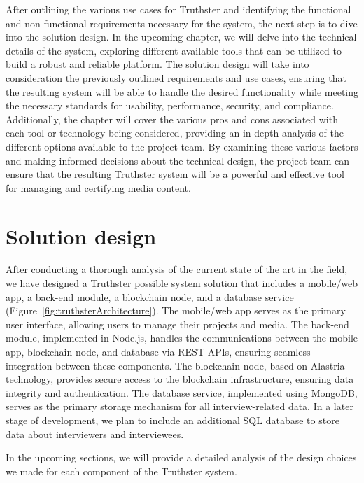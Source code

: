 \documentclass[target=mst,aauheader=]{thud}
\begin{document}
After outlining the various use cases for Truthster and identifying the functional and non-functional requirements necessary for the system, the next step is to dive into the solution design. In the upcoming chapter, we will delve into the technical details of the system, exploring different available tools that can be utilized to build a robust and reliable platform. The solution design will take into consideration the previously outlined requirements and use cases, ensuring that the resulting system will be able to handle the desired functionality while meeting the necessary standards for usability, performance, security, and compliance. Additionally, the chapter will cover the various pros and cons associated with each tool or technology being considered, providing an in-depth analysis of the different options available to the project team. By examining these various factors and making informed decisions about the technical design, the project team can ensure that the resulting Truthster system will be a powerful and effective tool for managing and certifying media content.








\chapter{Solution design}
\label{chapter:solutionDesign}

After conducting a thorough analysis of the current state of the art in the field, we have designed a Truthster possible system solution that includes a mobile/web app, a back-end module, a blockchain node, and a database service (Figure~\ref{fig:truthsterArchitecture}). The mobile/web app serves as the primary user interface, allowing users to manage their projects and media. The back-end module, implemented in Node.js, handles the communications between the mobile app, blockchain node, and database via REST APIs, ensuring seamless integration between these components. The blockchain node, based on Alastria technology, provides secure access to the blockchain infrastructure, ensuring data integrity and authentication. The database service, implemented using MongoDB, serves as the primary storage mechanism for all interview-related data. In a later stage of development, we plan to include an additional SQL database to store data about interviewers and interviewees.\par
In the upcoming sections, we will provide a detailed analysis of the design choices we made for each component of the Truthster system.
\end{document}
